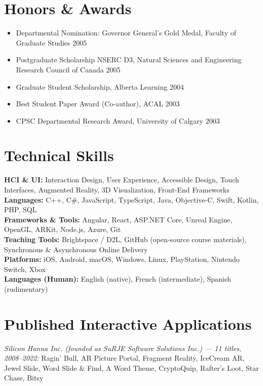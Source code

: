\documentclass[11pt]{article}
\begin{document}
\section*{Honors \& Awards}
\begin{itemize}[nosep,leftmargin=*]
    \item Departmental Nomination: Governor General's Gold Medal, Faculty of Graduate Studies \hfill 2005
    \item Postgraduate Scholarship NSERC D3, Natural Sciences and Engineering Research Council of Canada \hfill 2005
    \item Graduate Student Scholarship, Alberta Learning \hfill 2004
    \item Best Student Paper Award (Co-author), ACAL \hfill 2003
    \item CPSC Departmental Research Award, University of Calgary \hfill 2003
\end{itemize}

\section*{Technical Skills}
\textbf{HCI \& UI:} Interaction Design, User Experience, Accessible Design, Touch Interfaces, Augmented Reality, 3D Visualization, Front-End Frameworks \\
\textbf{Languages:} C++, C\#, JavaScript, TypeScript, Java, Objective-C, Swift, Kotlin, PHP, SQL \\
\textbf{Frameworks \& Tools:} Angular, React, ASP.NET Core, Unreal Engine, OpenGL, ARKit, Node.js, Azure, Git \\
\textbf{Teaching Tools:} Brightspace / D2L, GitHub (open-source course materials), Synchronous \& Asynchronous Online Delivery \\
\textbf{Platforms:} iOS, Android, macOS, Windows, Linux, PlayStation, Nintendo Switch, Xbox \\
\textbf{Languages (Human):} English (native), French (intermediate), Spanish (rudimentary)

\section*{Published Interactive Applications}
\textit{Silicon Hanna Inc. (founded as SuRJE Software Solutions Inc.) --- 11 titles, 2008--2022:} Ragin' Bull, AR Picture Portal, Fragment Reality, IceCream AR, Jewel Slide, Word Slide \& Find, A Word Theme, CryptoQuip, Rafter's Loot, Star Chase, Bitsy
\end{document}
